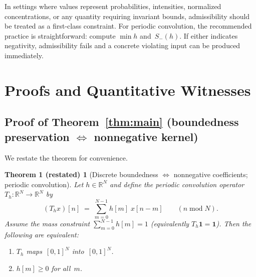 \documentclass[11pt,a4paper]{article}
\theoremstyle{plain}
\theoremstyle{definition}
\theoremstyle{plain}
\newtheorem*{theoremrestate}{Theorem 1 (restated)}
\newcommand{\R}{\mathbb{R}}
\newcommand{\one}{\mathbf{1}}
\newcommand{\Sminus}{S_{-}}
\begin{document}
In settings where values represent probabilities, intensities, normalized
concentrations, or any quantity requiring invariant bounds, admissibility should
be treated as a first-class constraint.  For periodic convolution, the
recommended practice is straightforward: compute $\min h$ and~$\Sminus(h)$.  If
either indicates negativity, admissibility fails and a concrete violating input
can be produced immediately.


\appendix

\section{Proofs and Quantitative Witnesses}
\label{app:proofs}

\subsection{Proof of Theorem~\ref{thm:main} (boundedness preservation
  $\Leftrightarrow$ nonnegative kernel)}
\label{app:proof-main}

We restate the theorem for convenience.

\begin{theoremrestate}[Discrete boundedness $\Leftrightarrow$ nonnegative coefficients;
  periodic convolution]
Let $h \in \R^N$ and define the periodic convolution operator
$T_h : \R^N \to \R^N$ by
\[
  (T_h x)[n]
  \;=\;
  \sum_{m=0}^{N-1} h[m]\; x[n-m]
  \qquad (n \;\mathrm{mod}\; N).
\]
Assume the mass constraint $\sum_{m=0}^{N-1} h[m] = 1$ (equivalently
$T_h \one = \one$).  Then the following are equivalent:
\begin{enumerate}[label=(\roman*)]
  \item $T_h$ maps~$[0,1]^N$ into~$[0,1]^N$.
  \item $h[m] \ge 0$ for all~$m$.
\end{enumerate}
\end{theoremrestate}
\end{document}
